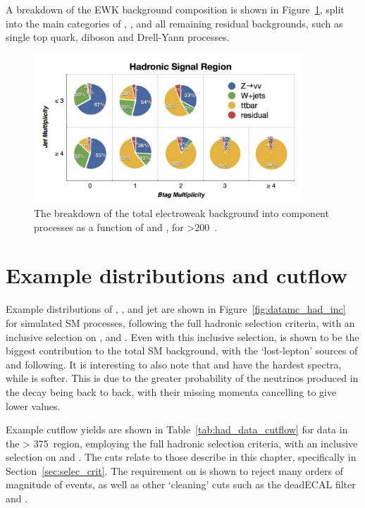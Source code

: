 A breakdown of the EWK background 
composition is shown in Figure~\ref{fig:background_decomp}, split into the main 
categories of \zinv, \wj, \ttbar and all remaining residual backgrounds, such as
single top quark, diboson and Drell-Yann processes.

\begin{figure}[t]
\centering
\hspace{0cm}\includegraphics[width=0.9\textwidth, trim=0 00 0 0, clip=true]
{Figs/ra1_had_bg_comp_v3.png}
\caption{The breakdown of the total electroweak background into component
processes as a function of \nj and \nb, for \HT>200~\gev.}
\label{fig:background_decomp}
\end{figure}

\section{Example distributions and cutflow}

Example distributions of \alphat, \HT, \mht and jet \Pt  are
shown in Figure~\ref{fig:datamc_had_inc} for simulated SM processes,
following the full hadronic selection criteria, with an inclusive selection on \HT,
\nj and \nb. Even with this inclusive selection, \zinv is shown to be the biggest
contribution to the total SM background, with the `lost-lepton' sources of \wj and
\ttbar following. It is interesting to also note that \zinv and \wj have the hardest \mht
spectra, while \ttbar is softer. This is due to the greater probability of the neutrinos produced
in the decay being back to back, with their missing momenta cancelling to give lower \mht values.

Example cutflow yields are shown in
Table~\ref{tab:had_data_cutflow} for data in the \HT > 375~\gev region, employing
the full hadronic selection criteria, with an inclusive selection on \nj and \nb.
The cuts relate to those describe in this chapter, specifically in
Section~\ref{sec:selec_crit}. The requirement on \alphat is shown to reject many
orders of magnitude of events, as well as other `cleaning' cuts such as the deadECAL
filter and \mhtmet.

